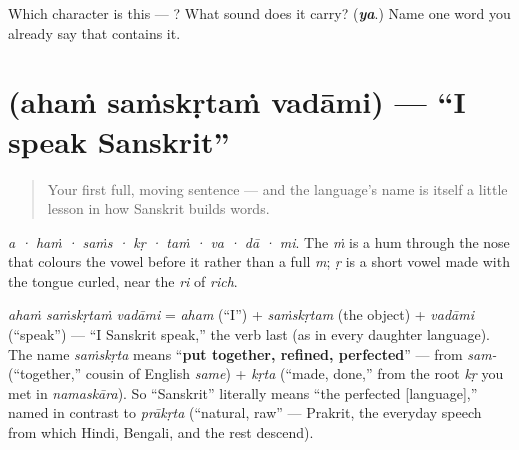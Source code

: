 \begin{tcolorbox}[breakable,colback=teal!4,colframe=teal!35!black,title={Before you move on}]
Which character is this — ? What sound does it carry? (\emph{\textbf{ya}}.) Name one word you already say that contains it.
\end{tcolorbox}
\section[\texorpdfstring{\sk{अहं} \sk{संस्कृतं} \sk{वदामि} (ahaṁ saṁskṛtaṁ vadāmi)}{अहं संस्कृतं वदामि (ahaṁ saṁskṛtaṁ vadāmi)}]{   (ahaṁ saṁskṛtaṁ vadāmi) — \textquotedblleft{}I speak Sanskrit\textquotedblright{}}

\label{lesson:SA-C05-aham-samskritam-vadami}



\begin{quote}
Your first full, moving sentence — and the language's name is itself a little lesson in how Sanskrit builds words.
\end{quote}

\begin{sounds}
\emph{a · haṁ · saṁs · kṛ · taṁ · va · dā · mi}. The \emph{ṁ} is a hum through the nose that colours the vowel before it rather than a full \emph{m}; \emph{ṛ} is a short vowel made with the tongue curled, near the \emph{ri} of \emph{rich}.
\end{sounds}

\begin{cousinweb}
\emph{ahaṁ saṁskṛtaṁ vadāmi} = \emph{aham} (\textquotedblleft{}I\textquotedblright{}) + \emph{saṁskṛtam} (the object) + \emph{vadāmi} (\textquotedblleft{}speak\textquotedblright{}) — \textquotedblleft{}I Sanskrit speak,\textquotedblright{} the verb last (as in every daughter language). The name \emph{saṁskṛta} means \textquotedblleft{}\textbf{put together, refined, perfected}\textquotedblright{} — from \emph{sam-} (\textquotedblleft{}together,\textquotedblright{} cousin of English \emph{same}) + \emph{kṛta} (\textquotedblleft{}made, done,\textquotedblright{} from the root \emph{kṛ} you met in \emph{namaskāra}). So \textquotedblleft{}Sanskrit\textquotedblright{} literally means \textquotedblleft{}the perfected {[}language{]},\textquotedblright{} named in contrast to \emph{prākṛta} (\textquotedblleft{}natural, raw\textquotedblright{} — Prakrit, the everyday speech from which Hindi, Bengali, and the rest descend).
\end{cousinweb}

